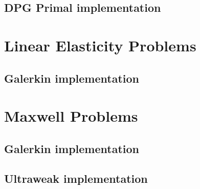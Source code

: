 \subsection{DPG Primal implementation}
\label{subsec:poisson-ultraweak}

\section{Linear Elasticity Problems}
\label{sec:elasticity}

\subsection{Galerkin implementation}
\label{subsec:maxwell-galerkin}

\section{Maxwell Problems}
\label{sec:maxwell}

\subsection{Galerkin implementation}
\label{subsec:maxwell-galerkin}

\subsection{Ultraweak implementation}
\label{subsec:maxwell-galerkin}



%


